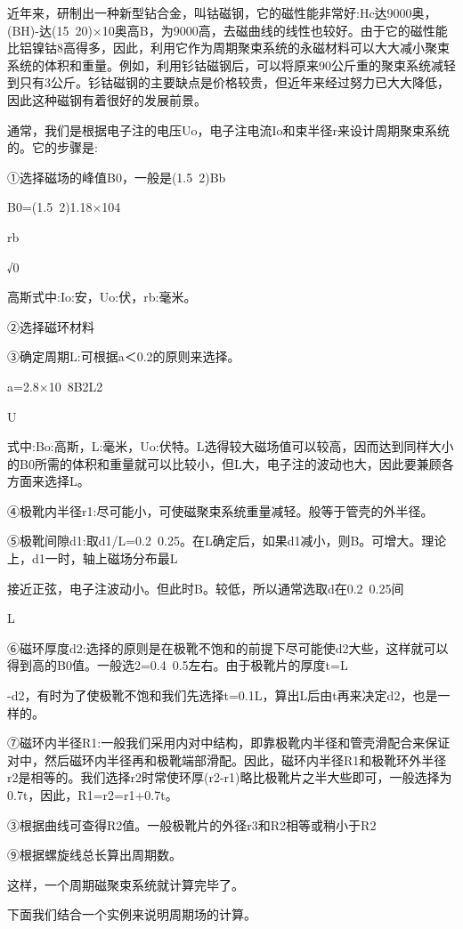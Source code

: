 近年来，研制出一种新型钻合金，叫钴磁钢，它的磁性能非常好:Hc达9000奥，(BH)-达(15~20)×10奥高B，为9000高，去磁曲线的线性也较好。由于它的磁性能比铝镍钴8高得多，因此，利用它作为周期聚束系统的永磁材料可以大大减小聚束系统的体积和重量。例如，利用钐钴磁钢后，可以将原来90公斤重的聚束系统减轻到只有3公斤。钐钴磁钢的主要缺点是价格较贵，但近年来经过努力已大大降低，因此这种磁钢有着很好的发展前景。


通常，我们是根据电子注的电压Uo，电子注电流Io和束半径r来设计周期聚束系统的。它的步骤是:


①选择磁场的峰值B0，一般是(1.5~2)Bb


B0=(1.5~2)1.18×104


rb


√0


高斯式中:Io:安，Uo:伏，rb:毫米。


②选择磁环材料


③确定周期L:可根据a＜0.2的原则来选择。


a=2.8×10~8B2L2


U


式中:Bo:高斯，L:毫米，Uo:伏特。L选得较大磁场值可以较高，因而达到同样大小的B0所需的体积和重量就可以比较小，但L大，电子注的波动也大，因此要兼顾各方面来选择L。


④极靴内半径r1:尽可能小，可使磁聚束系统重量减轻。般等于管壳的外半径。


⑤极靴间隙d1:取d1/L=0.2~0.25。在L确定后，如果d1减小，则B。可增大。理论上，d1一时，轴上磁场分布最L


接近正弦，电子注波动小。但此时B。较低，所以通常选取d在0.2~0.25间


L


⑥磁环厚度d2:选择的原则是在极靴不饱和的前提下尽可能使d2大些，这样就可以得到高的B0值。一般选2=0.4~0.5左右。由于极靴片的厚度t=L


-d2，有时为了使极靴不饱和我们先选择t=0.1L，算出L后由t再来决定d2，也是一样的。


⑦磁环内半径R1:一般我们采用内对中结构，即靠极靴内半径和管壳滑配合来保证对中，然后磁环内半径再和极靴端部滑配。因此，磁环内半径R1和极靴环外半径r2是相等的。我们选择r2时常使环厚(r2-r1)略比极靴片之半大些即可，一般选择为0.7t，因此，R1=r2=r1+0.7t。


③根据曲线可查得R2值。一般极靴片的外径r3和R2相等或稍小于R2


⑨根据螺旋线总长算出周期数。


这样，一个周期磁聚束系统就计算完毕了。


下面我们结合一个实例来说明周期场的计算。


